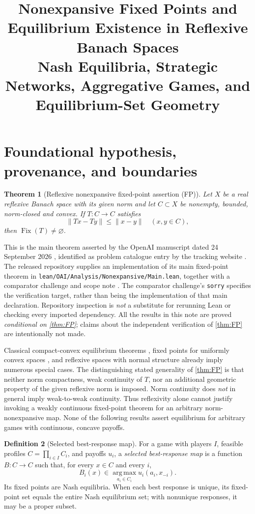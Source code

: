 \documentclass[11pt]{article}
\title{Nonexpansive Fixed Points and Equilibrium Existence in Reflexive Banach Spaces\\\large Nash Equilibria, Strategic Networks, Aggregative Games, and Equilibrium-Set Geometry}
\newtheorem{theorem}{Theorem}[section]
\theoremstyle{definition}\newtheorem{definition}[theorem]{Definition}
\newcommand{\Fix}{\operatorname{Fix}}
\newcommand{\argmax}{\operatorname*{arg\,max}}
\begin{document}
\section{Foundational hypothesis, provenance, and boundaries}
\begin{theorem}[Reflexive nonexpansive fixed-point assertion (FP)\label{thm:FP}]
Let $X$ be a real reflexive Banach space with its given norm and let $C\subset X$ be nonempty, bounded, norm-closed and convex. If $T:C\to C$ satisfies
\begin{equation}\label{eq:nonexp}\|Tx-Ty\|\le\|x-y\|\quad(x,y\in C),\end{equation}
then $\Fix(T)\ne\varnothing$.
\end{theorem}
This is the main theorem asserted by the OpenAI manuscript dated 24 September 2026 \cite{OAIFP}, identified as problem catalogue entry by the tracking website \cite{Tracker}. The released repository supplies an implementation of its main fixed-point theorem in \texttt{lean/OAI/Analysis/Nonexpansive/Main.lean}, together with a comparator challenge and scope note \cite{LeanMain,LeanScope,LeanComparator}. The comparator challenge's \texttt{sorry} specifies the verification target, rather than being the implementation of that main declaration. Repository inspection is \emph{not} a substitute for rerunning Lean or checking every imported dependency. All the results in this note are proved \emph{conditional on \cref{thm:FP}}; claims about the independent verification of \cref{thm:FP} are intentionally not made.

Classical compact-convex equilibrium theorems \cite{Glicksberg1952}, fixed points for uniformly convex spaces \cite{Browder1965,Gohde1965}, and reflexive spaces with normal structure \cite{Kirk1965} already imply numerous special cases. The distinguishing stated generality of \cref{thm:FP} is that neither norm compactness, weak continuity of $T$, nor an additional geometric property of the given reflexive norm is imposed. Norm continuity does \emph{not} in general imply weak-to-weak continuity. Thus reflexivity alone cannot justify invoking a weakly continuous fixed-point theorem for an arbitrary norm-nonexpansive map. None of the following results assert equilibrium for arbitrary games with continuous, concave payoffs.

\begin{definition}[Selected best-response map]
For a game with players $I$, feasible profiles $C=\prod_{i\in I}C_i$, and payoffs $u_i$, a \emph{selected best-response map} is a function $B:C\to C$ such that, for every $x\in C$ and every $i$,
\[B_i(x)\in \argmax_{a_i\in C_i}u_i(a_i,x_{-i}).\]
Its fixed points are Nash equilibria. When each best response is unique, its fixed-point set equals the entire Nash equilibrium set; with nonunique responses, it may be a proper subset.
\end{definition}
\end{document}
